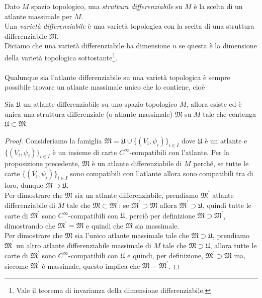 Dato $ M $ spazio topologico, una \textit{struttura differenziabile} su $ M $ è la scelta di un atlante massimale per $ M $.\\
Una \textit{varietà differenziabile} è una varietà topologica con la scelta di una struttura differenziabile $ \mathfrak{M} $.\\
Diciamo che una varietà differenziabile ha dimensione $ n $ se questa è la dimensione della varietà topologica sottostante\footnote{%
	Vale il teorema di invarianza della dimensione differenziabile.%
}.\\\\
%
Qualunque sia l'atlante differenziabile su una varietà topologica è sempre possibile trovare un atlante massimale unico che lo contiene, cioè

\begin{definition}
	Sia $ \mathfrak{U} $ un atlante differenziabile su uno spazio topologico $ M $, allora esiste ed è unica una struttura differenziale (o atlante massimale) $ \mathfrak{M} $ su $ M $ tale che contenga $ \mathfrak{U} \subset \mathfrak{M} $.
\end{definition}

\begin{proof}
	Consideriamo la famiglia $ \mathfrak{M} = \mathfrak{U} \cup \{(V_{i},\psi_{i})\}_{i \in I} $ dove $ \mathfrak{U} $ è un atlante e $ \{(V_{i},\psi_{i})\}_{i \in I} $ è un insieme di carte $ C^{\infty} $-compatibili con l'atlante. Per la proposizione precedente, $ \mathfrak{M} $ è un atlante differenziabile di $ M $ perché, se tutte le carte $ \{(V_{i},\psi_{i})\}_{i \in I} $ sono compatibili con l'atlante allora sono compatibili tra di loro, dunque $ \mathfrak{M} \supset \mathfrak{U} $.\\
	Per dimostrare che $ \mathfrak{M} $ sia un atlante differenziabile, prendiamo $ \mathfrak{M}^{\prime} $ atlante differenziabile di $ M $ tale che $ \mathfrak{M} \subset \mathfrak{M}^{\prime} $: se $ \mathfrak{M}^{\prime} \supset \mathfrak{M} $ allora $ \mathfrak{M}^{\prime} \supset \mathfrak{U} $, quindi tutte le carte di $ \mathfrak{M}^{\prime} $ sono $ C^{\infty} $-compatibili con $ \mathfrak{U} $, perciò per definizione $ \mathfrak{M} \supset \mathfrak{M}^{\prime} $, dimostrando che $ \mathfrak{M}^{\prime} = \mathfrak{M} $ e quindi che $ \mathfrak{M} $ sia massimale.\\
	Per dimostrare che $ \mathfrak{M} $ sia l'unico atlante massimale tale che $ \mathfrak{M} \supset \mathfrak{U} $, prendiamo $ \mathfrak{M}^{\prime} $ un altro atlante differenziabile massimale di $ M $ tale che $ \mathfrak{M} \supset \mathfrak{U} $, allora tutte le carte di $ \mathfrak{M}^{\prime} $ sono $ C^{\infty} $-compatibili con $ \mathfrak{U} $ e quindi, per definizione, $ \mathfrak{M}^{\prime} \supset \mathfrak{M} $ ma, siccome $ \mathfrak{M}^{\prime} $ è massimale, questo implica che $ \mathfrak{M} = \mathfrak{M}^{\prime} $.
\end{proof}

